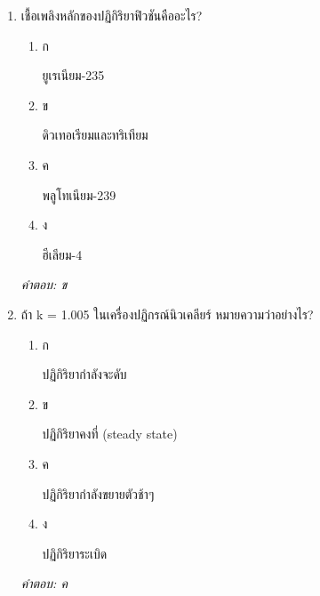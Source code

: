 \documentclass[12pt]{article}
\begin{document}
\begin{enumerate}[label=\arabic*., itemsep=0.5\baselineskip, topsep=0.5\baselineskip, leftmargin=*]
\item เชื้อเพลิงหลักของปฏิกิริยาฟิวชันคืออะไร?
\begin{enumerate}[label=\alph*)., itemsep=0.3\baselineskip, topsep=0.3\baselineskip]
\item ก\ 
\begin{minipage}[t]{0.9\linewidth}
\raggedright ยูเรเนียม-235
\end{minipage}
\item ข\ 
\begin{minipage}[t]{0.9\linewidth}
\raggedright ดิวเทอเรียมและทริเทียม
\end{minipage}
\item ค\ 
\begin{minipage}[t]{0.9\linewidth}
\raggedright พลูโทเนียม-239
\end{minipage}
\item ง\ 
\begin{minipage}[t]{0.9\linewidth}
\raggedright ฮีเลียม-4
\end{minipage}
\end{enumerate}
\vspace{-0.3\baselineskip}
\begin{small}
\textit{คำตอบ: ข}
\end{small}

\item ถ้า k = 1.005 ในเครื่องปฏิกรณ์นิวเคลียร์ หมายความว่าอย่างไร?
\begin{enumerate}[label=\alph*)., itemsep=0.3\baselineskip, topsep=0.3\baselineskip]
\item ก\ 
\begin{minipage}[t]{0.9\linewidth}
\raggedright ปฏิกิริยากำลังจะดับ
\end{minipage}
\item ข\ 
\begin{minipage}[t]{0.9\linewidth}
\raggedright ปฏิกิริยาคงที่ (steady state)
\end{minipage}
\item ค\ 
\begin{minipage}[t]{0.9\linewidth}
\raggedright ปฏิกิริยากำลังขยายตัวช้าๆ
\end{minipage}
\item ง\ 
\begin{minipage}[t]{0.9\linewidth}
\raggedright ปฏิกิริยาระเบิด
\end{minipage}
\end{enumerate}
\vspace{-0.3\baselineskip}
\begin{small}
\textit{คำตอบ: ค}
\end{small}


\end{enumerate}
\end{document}
